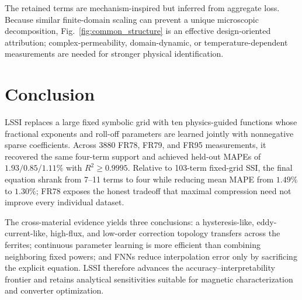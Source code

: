 \documentclass[lettersize,journal]{IEEEtran}
\begin{document}
The retained terms are mechanism-inspired but inferred from aggregate loss. Because similar finite-domain scaling can prevent a unique microscopic decomposition, Fig.~\ref{fig:common_structure} is an effective design-oriented attribution; complex-permeability, domain-dynamic, or temperature-dependent measurements are needed for stronger physical identification.

\section{Conclusion}

LSSI replaces a large fixed symbolic grid with ten physics-guided functions whose fractional exponents and roll-off parameters are learned jointly with nonnegative sparse coefficients. Across 3880 FR78, FR79, and FR95 measurements, it recovered the same four-term support and achieved held-out MAPEs of $1.93/0.85/1.11\%$ with $R^2\geq0.9995$. Relative to 103-term fixed-grid SSI, the final equation shrank from 7--11 terms to four while reducing mean MAPE from $1.49\%$ to $1.30\%$; FR78 exposes the honest tradeoff that maximal compression need not improve every individual dataset.

The cross-material evidence yields three conclusions: a hysteresis-like, eddy-current-like, high-flux, and low-order correction topology transfers across the ferrites; continuous parameter learning is more efficient than combining neighboring fixed powers; and FNNs reduce interpolation error only by sacrificing the explicit equation. LSSI therefore advances the accuracy--interpretability frontier and retains analytical sensitivities suitable for magnetic characterization and converter optimization.



\end{document}

